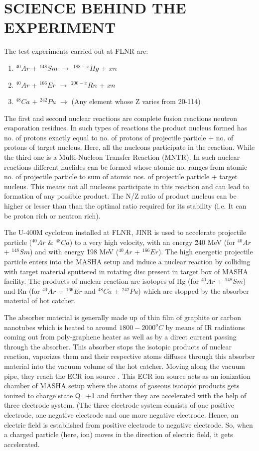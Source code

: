 \documentclass[12pt]{article}
\begin{document}
\section{SCIENCE BEHIND THE EXPERIMENT}
The test experiments carried out at FLNR are:
\begin{enumerate}
\item $^{40}Ar$ + $^{148}Sm$ $\rightarrow$ $^{188-x}Hg$ + $xn$
\item $^{40}Ar$ + $^{166}Er$ $\rightarrow$ $^{206-x}Rn$ + $xn$
\item $^{48}Ca$ + $^{242}Pu$ $\rightarrow$ (Any element whose Z varies from 20-114)
\end{enumerate}
The first and second nuclear reactions are complete fusion reactions neutron evaporation residues. In such types of reactions the product nucleus formed has no. of protons exactly equal to no. of protons of projectile particle + no. of protons of target nucleus. Here, all the nucleons participate in the reaction. While the third one is a Multi-Nucleon Transfer Reaction (MNTR). In such nuclear reactions different nuclides can be formed whose atomic no. ranges from atomic no. of projectile particle to sum of atomic nos. of projectile particle + target nucleus. This means not all nucleons participate in this reaction and can lead to formation of any possible product. The N/Z ratio of product nucleus can be higher or lesser than than the optimal ratio required for its stability (i.e. It can be proton rich or neutron rich).

The U-400M cyclotron installed at FLNR, JINR is used to accelerate projectile particle ($^{40}Ar$ \& $^{48}Ca$) to a very high velocity, with an energy \~ 240 MeV (for $^{40}Ar$ + $^{148}Sm$) and with energy \~ 198 MeV ($^{40}Ar$ + $^{166}Er$). The high energetic projectile particle enters into the MASHA setup and induce a nuclear reaction by colliding with target material sputtered in rotating disc present in target box of MASHA facility. The products of nuclear reaction are isotopes of Hg (for $^{40}Ar$ + $^{148}Sm$)  and Rn (for $^{40}Ar$ + $^{166}Er$ and $^{48}Ca$ + $^{242}Pu$) which are stopped by the absorber material of hot catcher.

The absorber material is generally made up of thin film of graphite or carbon nanotubes which is heated to around $1800-2000^oC$ by means of IR radiations coming out from poly-graphene heater as well as by a direct current passing through the absorber. This absorber stops the isotopic products of nuclear reaction, vaporizes them and their respective atoms diffuses through this absorber material into the vacuum volume of the hot catcher. Moving along the vacuum pipe, they reach the ECR ion source \cite{rodin2014separation}. This ECR ion source acts as an ionization chamber of MASHA setup where the atoms of gaseous isotopic products gets ionized to charge state Q=+1 and further they are accelerated with the help of three electrode system. (The three electrode system consists of one positive electrode, one negative electrode and one more negative electrode. Hence, an electric field is established from positive electrode to negative electrode. So, when a charged particle (here, ion) moves in the direction of electric field, it gets accelerated.
\end{document}
